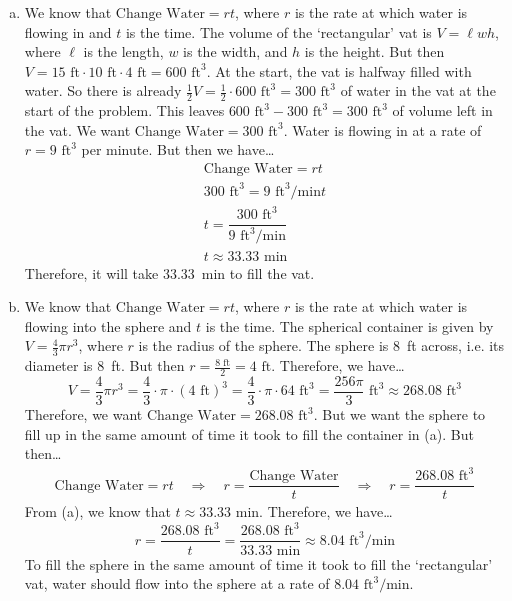 \documentclass[11pt,letterpaper]{article}
\begin{document}
\sol 
\begin{enumerate}[(a)]
\item We know that $\text{Change Water}= rt$, where $r$ is the rate at which water is flowing in and $t$ is the time. The volume of the `rectangular' vat is $V= \ell w h$, where $\ell$ is the length, $w$ is the width, and $h$ is the height. But then $V= 15 \text{ ft} \cdot 10 \text{ ft} \cdot 4 \text{ ft}= 600 \text{ ft}^3$. At the start, the vat is halfway filled with water. So there is already $\frac{1}{2} V= \frac{1}{2} \cdot 600 \text{ ft}^3= 300 \text{ ft}^3$ of water in the vat at the start of the problem. This leaves $600 \text{ ft}^3 - 300 \text{ ft}^3= 300 \text{ ft}^3$ of volume left in the vat. We want $\text{Change Water}= 300 \text{ ft}^3$. Water is flowing in at a rate of $r= 9 \text{ ft}^3$ per minute. But then we have\dots
	\[
	\begin{gathered}
	\text{Change Water}= rt \\
	300 \text{ ft}^3= 9 \text{ ft}^3/\text{min} t \\
	t= \dfrac{300 \text{ ft}^3}{9 \text{ ft}^3/\text{min}} \\
	t \approx 33.33 \text{ min}
	\end{gathered}
	\]
Therefore, it will take 33.33~min to fill the vat. \pspace

\item We know that $\text{Change Water}= rt$, where $r$ is the rate at which water is flowing into the sphere and $t$ is the time. The spherical container is given by $V= \frac{4}{3} \pi r^3$, where $r$ is the radius of the sphere. The sphere is 8~ft across, i.e. its diameter is 8~ft. But then $r= \frac{8 \text{ ft}}{2}= 4 \text{ ft}$. Therefore, we have\dots
	\[
	V= \dfrac{4}{3} \pi r^3= \dfrac{4}{3} \cdot \pi \cdot (4 \text{ ft})^3= \dfrac{4}{3} \cdot \pi \cdot 64 \text{ ft}^3= \dfrac{256 \pi}{3} \text{ ft}^3 \approx 268.08 \text{ ft}^3
	\]
Therefore, we want $\text{Change Water}= 268.08 \text{ ft}^3$. But we want the sphere to fill up in the same amount of time it took to fill the container in (a). But then\dots
	\[
	\begin{aligned}
	\text{Change Water}= rt \quad\Longrightarrow\quad r= \dfrac{\text{Change Water}}{t} \quad\Longrightarrow\quad r= \dfrac{268.08 \text{ ft}^3}{t}
	\end{aligned}
	\]
From (a), we know that $t \approx 33.33 \text{ min}$. Therefore, we have\dots
	\[
	r= \dfrac{268.08 \text{ ft}^3}{t}= \dfrac{268.08 \text{ ft}^3}{33.33 \text{ min}}\approx 8.04 \text{ ft}^3/\text{min}
	\]
To fill the sphere in the same amount of time it took to fill the `rectangular' vat, water should flow into the sphere at a rate of $8.04 \text{ ft}^3/\text{min}$. 
\end{enumerate}
\end{document}
